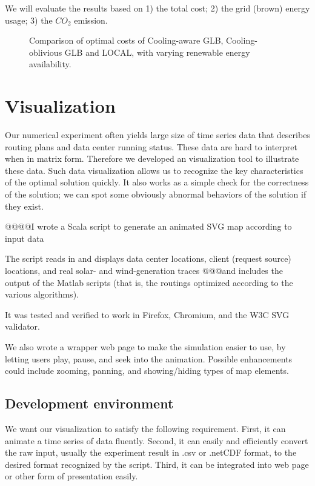 \documentclass{acm_proc_article-sp}
\begin{document}
We will evaluate the results based on 1) the total cost; 2) the grid (brown) energy usage; 3) the $CO_2$ emission.


\begin{figure*}
\centering
{}
\caption{Comparison of optimal costs of Cooling-aware GLB, Cooling-oblivious GLB and LOCAL, with varying renewable energy availability.}
\end{figure*}
\section{Visualization}
Our numerical experiment often yields large size of time series data that describes routing plans and data center running status. These data are hard to interpret when in matrix form. Therefore we developed an visualization tool to illustrate these data. Such data visualization allows us to recognize the key characteristics of the optimal solution quickly. It also works as a simple check for the correctness of the solution; we can spot some obviously abnormal behaviors of the solution if they exist. 


@@@@I wrote a Scala script to generate an animated SVG map according to input data

The script reads in and displays data center locations, client (request source) locations, and real solar- and wind-generation traces @@@and includes the output of the Matlab scripts (that is, the routings optimized according to the various algorithms).

It was tested and verified to work in Firefox, Chromium, and the W3C SVG validator.

We also wrote a wrapper web page to make the simulation easier to use, by letting users play, pause, and seek into the animation. Possible enhancements could include zooming, panning, and showing/hiding types of map elements.


\subsection{Development environment}
We want our visualization to satisfy the following requirement. First, it can animate a time series of data fluently. Second, it can easily and efficiently convert the raw input, usually the experiment result in .csv or .netCDF format, to the desired format recognized by the script. Third, it can be integrated into web page or other form of presentation easily. 
\end{document}

